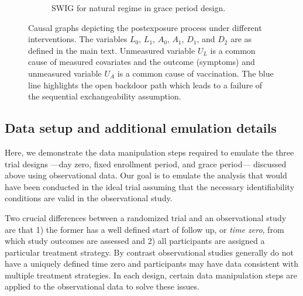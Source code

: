 \begin{appendices}
\begin{refsection}
\begin{figure}[p]
\begin{subfigure}{\linewidth}
        \caption{SWIG for natural regime in grace period design.}
        \end{subfigure}
        \caption{Causal graphs depicting the postexposure process under different interventions. The variables $L_0$, $L_1$, $A_0$, $A_1$, $D_1$, and $D_2$ are as defined in the main text. Unmeasured variable $U_L$ is a common cause of measured covariates and the outcome (symptoms) and unmeasured variable $U_A$ is a common cause of vaccination. The blue line highlights the open backdoor path which leads to a failure of the sequential exchangeability assumption.        \label{fig:swig1}
        }

    \end{figure}

    \clearpage

    
    \subsection{Data setup and additional emulation details} \label{sec:datamanip}
    Here, we demonstrate the data manipulation steps required to emulate the three trial designs ---day zero, fixed enrollment period, and grace period--- discussed above using observational data. Our goal is to emulate the analysis that would have been conducted in the ideal trial assuming that the necessary identifiability conditions are valid in the observational study.

    Two crucial differences between a randomized trial and an observational study are that 1) the former has a well defined start of follow up, or \textit{time zero}, from which study outcomes are assessed and 2) all participants are assigned a particular treatment strategy. By contrast observational studies generally do not have a uniquely defined time zero and participants may have data consistent with multiple treatment strategies. In each design, certain data manipulation steps are applied to the observational data to solve these issues. 


\end{refsection}
\end{appendices}
